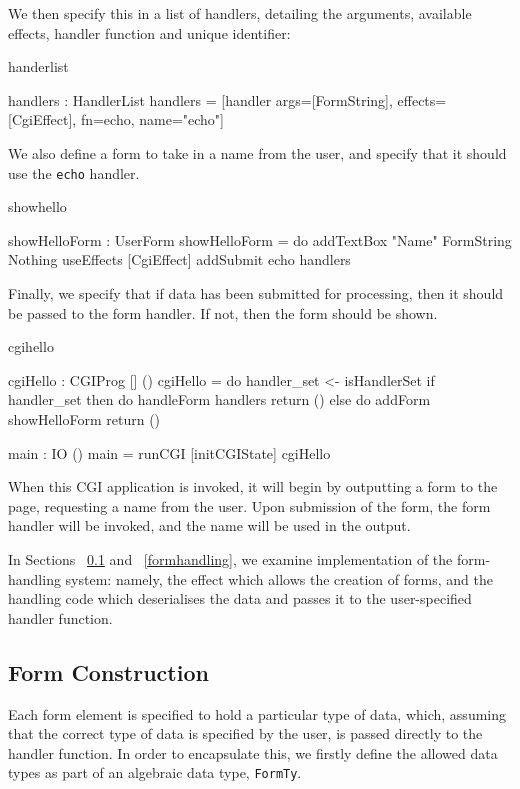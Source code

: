\noindent
We then specify this in a list of handlers, detailing the arguments, available effects, handler function and unique identifier:

\begin{SaveVerbatim}{handerlist}

handlers : HandlerList
handlers = [handler args=[FormString], 
                    effects=[CgiEffect], 
                    fn=echo, 
                    name="echo"]

\end{SaveVerbatim}

\noindent
We also define a form to take in a name from the user, and specify that it
should use the \texttt{echo} handler.

\begin{SaveVerbatim}{showhello}

showHelloForm : UserForm
showHelloForm = do
  addTextBox "Name" FormString Nothing
  useEffects [CgiEffect]
  addSubmit echo handlers

\end{SaveVerbatim}

\noindent
Finally, we specify that if data has been submitted for processing, then it
should be passed to the form handler. If not, then the form should be shown.

\begin{SaveVerbatim}{cgihello}

cgiHello : CGIProg [] ()
cgiHello = do
  handler_set <- isHandlerSet
  if handler_set then do
    handleForm handlers
    return ()
  else do
    addForm showHelloForm
    return ()

main : IO ()
main = runCGI [initCGIState] cgiHello

\end{SaveVerbatim}

\noindent
When this CGI application is invoked, it will begin by outputting a form to the
page, requesting a name from the user. Upon submission of the form, the form
handler will be invoked, and the name will be used in the output.

In Sections ~\ref{formcons} and ~\ref{formhandling}, we examine implementation
of the form-handling system: namely, the effect which allows the creation of
forms, and the handling code which deserialises the data and passes it to the
user-specified handler function.  

\subsection{Form Construction}
\label{formcons}
Each form element is specified to hold a particular type of data, which, assuming that the correct type of data is specified by the user, is passed directly to the handler function. In order to encapsulate this, we firstly define the allowed data types as part of an algebraic data type, \texttt{FormTy}.

